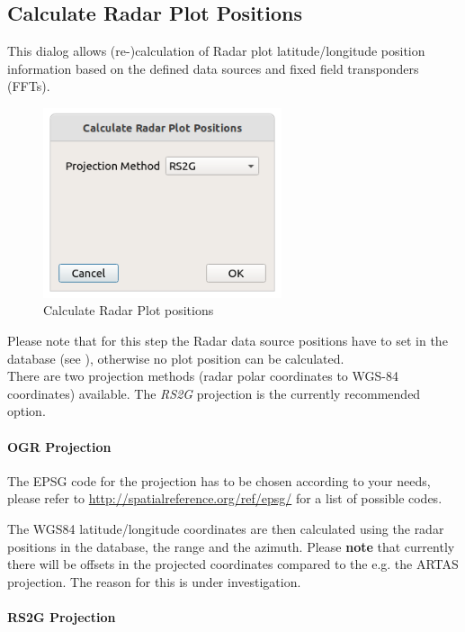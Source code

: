 \subsection{Calculate Radar Plot Positions}
\label{sec:ui_proc_radar_plot_pos}

This dialog allows (re-)calculation of Radar plot latitude/longitude position information based on the defined data sources and fixed field transponders (FFTs).

\begin{figure}[H]
  \center
    \includegraphics[width=7cm]{figures/proc_calc_radar.png}
  \caption{Calculate Radar Plot positions}
\end{figure}

Please note that for this step the Radar data source positions have to set in the database (see ), otherwise no plot position can be calculated.  \\

There are two projection methods (radar polar coordinates to WGS-84 coordinates) available. The \textit{RS2G} projection is the currently recommended option.

\paragraph{OGR Projection}

The EPSG code for the projection has to be chosen according to your needs, please refer to \url{http://spatialreference.org/ref/epsg/} for a list of possible codes.

The WGS84 latitude/longitude coordinates are then calculated using the radar positions in the database, the range and the azimuth. Please \textbf{note} that currently there will be offsets in the projected coordinates compared to the e.g. the ARTAS projection. The reason for this is under investigation.

\paragraph{RS2G Projection}

